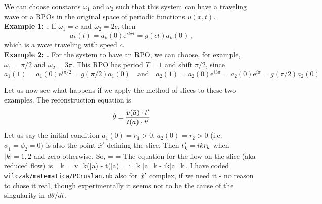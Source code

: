 We can choose constants $\omega_1$ and $\omega_2$ such that this system can have
a traveling wave or a RPOs in the original space of periodic functions $u(x,t)$.\\
{\bf Example 1: \Reqv.} If $\omega_1 = c$ and $\omega_2 = 2c$, then
\[ a_k(t) = a_k(0) \mathrm{e}^{ikct} = g(ct) a_k(0)\,, \]
which is a wave traveling with speed $c$.\\
{\bf Example 2: \Rpo.} For the system to have an RPO, we can choose, for example,
$\omega_1 = \pi/2$ and $\omega_2 = 3\pi$.  This RPO has period $T = 1$ and shift $\pi/2$, since
\[ a_1(1) = a_1(0) \mathrm{e}^{i\pi/2} = g(\pi/2) a_1(0) \quad \mathrm{and} \quad
   a_2(1) = a_2(0) \mathrm{e}^{i3\pi} = a_2(0) \mathrm{e}^{i\pi} = g(\pi/2) a_2(0) \]

Let us now see what happens if we apply the method of slices to these two examples.
The reconstruction equation is
\[ \dot{\theta} = \frac{v(\bar{a}) \cdot t'_{}}{t(\bar{a}) \cdot t'_{}} \]
Let us say the initial condition $a_1(0) = r_1 > 0$, $a_2(0) = r_2 > 0$
(i.e. $\phi_1 = \phi_2 = 0$) is also the point ${\hat{x}'}$ defining the slice.  Then
$t'_{k} = ikr_k$ when $|k| = 1,2$ and zero otherwise.  So,
\beq
\dot{\theta} = 
                = 
The equation for the flow on the slice (aka reduced flow) is
\beq
{}_k = v_k(\bar{a}) -  t(\bar{a})
                   = i\omega_k \bar{a}_k -  ik\bar{a}_k\,.
\medskip{}
I have coded \texttt{wilczak/matematica/PCruslan.nb} also for
${\hat{x}'}$ complex, if we need it - no reason to chose it real,
though experimentally it seems not to be the cause of the singularity in
$d\theta/dt$.

